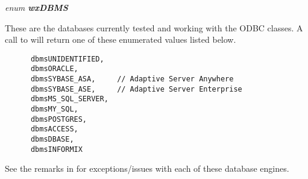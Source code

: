 
\label{ENUMwxdbsqllogstate}

{\it enum {\bf wxDBMS}}

These are the databases currently tested and working with the ODBC classes.  A call to  will return one of these enumerated values listed below.

\begin{verbatim}
      dbmsUNIDENTIFIED,
      dbmsORACLE,
      dbmsSYBASE_ASA,     // Adaptive Server Anywhere
      dbmsSYBASE_ASE,     // Adaptive Server Enterprise
      dbmsMS_SQL_SERVER,
      dbmsMY_SQL,
      dbmsPOSTGRES,
      dbmsACCESS,
      dbmsDBASE,
      dbmsINFORMIX
\end{verbatim}

See the remarks in  for exceptions/issues with each of these database engines.




